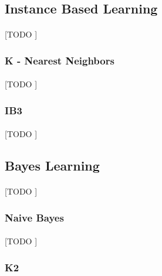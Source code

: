 \documentclass{article}
\begin{document}
		\subsection{Instance Based Learning}
		\label{sec:decision-trees}

			\paragraph{}
			[TODO ]

			\subsubsection{K - Nearest Neighbors}
			\label{sec:knn}

				\paragraph{}
				[TODO ]

			\subsubsection{IB3}
			\label{sec:ib3}

				\paragraph{}
				[TODO ]

		\subsection{Bayes Learning}
		\label{sec:decision-trees}

			\paragraph{}
			[TODO ]

			\subsubsection{Naive Bayes}
			\label{sec:naive-bayes}

				\paragraph{}
				[TODO ]

			\subsubsection{K2}
			\label{sec:k2-bayes}
\end{document}
